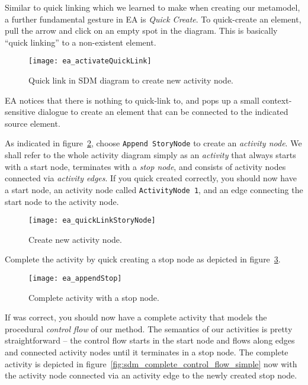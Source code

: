Similar to quick linking which we learned to make when creating our metamodel, a further fundamental gesture in EA is \emph{Quick Create}.
To quick-create an element, pull the arrow and click on an empty spot in the diagram. This is basically ``quick linking'' to a non-existent element.

\begin{figure}[htp]
\begin{center}
  \texttt{[image: ea\_activateQuickLink]}
  \caption{Quick link in SDM diagram to create new activity node.}  
  \label{fig:sdm_quicklink}
\end{center}
\end{figure}

EA notices that there is nothing to quick-link to, and pops up a small context-sensitive dialogue to create an element that can be connected to the indicated
source element.

As indicated in figure~\ref{fig:sdm_new_activity_node}, choose \texttt{Append StoryNode} to create an \emph{activity node}. We
 shall refer to the whole activity diagram simply as an \emph{activity} that always starts with a start node, terminates with a \emph{stop%
node}, and consists of activity nodes connected via \emph{activity edges}. If you quick created correctly, you should now have a start node,
an activity node called \texttt{ActivityNode 1}, and an edge connecting the start node to the activity node.

\begin{figure}[htp]
\begin{center}
  \texttt{[image: ea\_quickLinkStoryNode]}
  \caption{Create new activity node.}  
  \label{fig:sdm_new_activity_node}
\end{center}
\end{figure}

Complete the activity by quick creating a stop node as depicted in figure~\ref{fig:sdm_stop_node}.

\begin{figure}[htp]
\begin{center}
  \texttt{[image: ea\_appendStop]}
  \caption{Complete activity with a stop node.}  
  \label{fig:sdm_stop_node}
\end{center}
\end{figure}

If was correct, you should now have a complete activity that models the procedural \emph{control flow} of our method.  The semantics of our
activities is pretty straightforward -- the control flow starts in the start node and flows along edges and connected activity nodes until it terminates in a
stop node.  The complete activity is depicted in figure~\ref{fig:sdm_complete_control_flow_simple} now with the activity node connected via an activity edge to
the newly created stop node.

